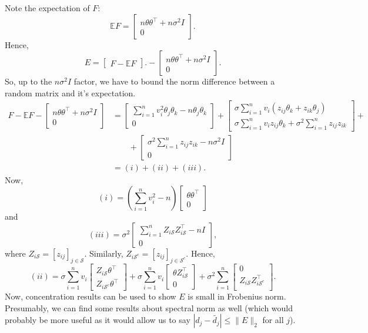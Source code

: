 \documentclass[11pt]{article}
\newcommand{\E}{\mathbb{E}}
\newcommand{\norm}[1]{\lVert #1 \rVert}
\renewcommand{\S}{\mathcal{S}}
\begin{document}
Note the expectation of $F$:
\[
\E F =
\begin{bmatrix}
n \theta\theta^{\top} + n\sigma^2 I \\
0
\end{bmatrix}.
\]
Hence, 
\[
E = 
\begin{bmatrix}
F - \E F
\end{bmatrix}.
-
\begin{bmatrix}
n \theta\theta^{\top} + n\sigma^2 I \\
0
\end{bmatrix}.
\]
So, up to the $n\sigma^2I$ factor, we have to bound the norm difference between a random matrix and it's expectation.
\begin{align}
F - \E F -
 \begin{bmatrix}
n \theta\theta^{\top} + n\sigma^2 I \\
0
\end{bmatrix}
 & =
\begin{bmatrix}
\sum_{i=1}^nv_i^2\theta_j\theta_k  - n \theta_j\theta_k\\
0
\end{bmatrix}
+
\begin{bmatrix}
\sigma \sum_{i=1}^n v_i(z_{ij}\theta_k + z_{ik}\theta_j) \\
\sigma \sum_{i=1}^n v_iz_{ij}\theta_k + \sigma^2 \sum_{i=1}^n z_{ij}z_{ik}
\end{bmatrix}
+ \\
& \qquad + 
\begin{bmatrix}
 \sigma^2 \sum_{i=1}^n z_{ij}z_{ik} - n\sigma^2 I \\
0
\end{bmatrix} \\
& = (i) + (ii) + (iii).
\end{align}
Now,
\[
(i) = 
(\sum_{i=1}^nv_i^2 -n)
\begin{bmatrix}
\theta\theta^{\top}\\
0
\end{bmatrix}
\]
and
\[
(iii) = 
\sigma^2 
\begin{bmatrix}
\sum_{i=1}^n Z_{i\S}Z_{i\S}^{\top} - n I \\
0
\end{bmatrix},
\]
where $Z_{i\S} = [z_{ij}]_{j \in \S}$. Similarly, $Z_{i\S^c} = [z_{ij}]_{j \in \S^c}$.  Hence, 
\[
(ii) = 
\sigma \sum_{i=1}^n v_i
\begin{bmatrix}
 Z_{i\S}\theta^{\top}\\
 Z_{i\S^c}\theta^{\top}
\end{bmatrix}
+
\sigma \sum_{i=1}^n v_i
\begin{bmatrix}
\theta Z_{i\S}^{\top}\\
0
\end{bmatrix}
+
\sigma^2 \sum_{i=1}^n 
\begin{bmatrix}
0 \\
Z_{i\S} Z_{i\S^c}^{\top}\\
\end{bmatrix}.
\]
Now, concentration results can be used to show $E$ is small in Frobenius norm.  Presumably, we can find some results about spectral norm as well (which would
probably be more useful as it would allow us to say $|d_j - \tilde{d_j}| \leq \norm{E}_2$ for all $j$).
\end{document}
